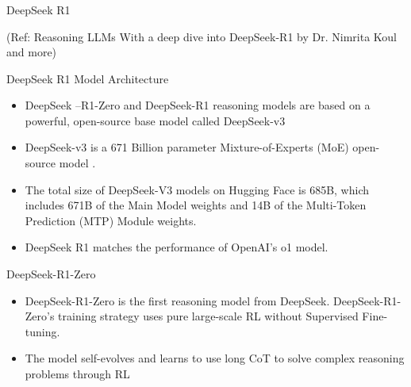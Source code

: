 \begin{frame}[fragile]\frametitle{}
\begin{center}
{\Large DeepSeek R1}

{\tiny (Ref: Reasoning LLMs With a deep dive into DeepSeek-R1 by Dr. Nimrita Koul and more)}

\end{center}


\end{frame}



\begin{frame}[fragile]{DeepSeek R1 Model Architecture}


    \begin{itemize}
        \item  DeepSeek –R1-Zero and DeepSeek-R1 reasoning models are based on a 
powerful, open-source base model called DeepSeek-v3
        \item  DeepSeek-v3 is a 671 Billion parameter Mixture-of-Experts (MoE) open-
source model . 
        \item  The total size of DeepSeek-V3 models on Hugging Face is 685B, which 
includes 671B of the Main Model weights and 14B of the Multi-Token 
Prediction (MTP) Module weights.
		\item DeepSeek R1 matches the performance of OpenAI's o1 model. 
    \end{itemize}
\end{frame}

\begin{frame}[fragile]{DeepSeek-R1-Zero}


    \begin{itemize}
        \item  DeepSeek-R1-Zero is the first reasoning model from DeepSeek.  
DeepSeek-R1-Zero's training strategy uses pure large-scale RL without 
Supervised Fine-tuning. 
        \item  The model self-evolves and learns to use long CoT to solve complex 
reasoning problems through RL
    \end{itemize}
\end{frame}


